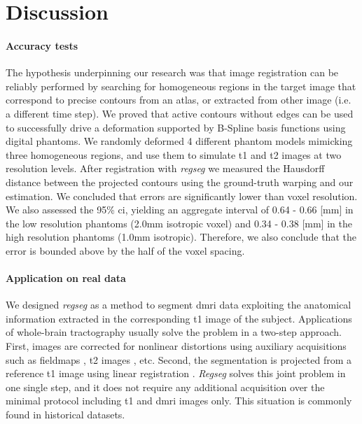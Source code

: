 \section{Discussion}
\label{sec:discussion}

\paragraph*{Accuracy tests}
The hypothesis underpinning our research was that image registration can be reliably performed
  by searching for homogeneous regions in the target image that correspond to precise contours
  from an atlas, or extracted from other image (i.e. a different time step).
We proved that active contours without edges can be used to successfully drive a
  deformation supported by B-Spline basis functions using digital phantoms.
We randomly deformed 4 different phantom models mimicking three homogeneous regions,
  and use them to simulate \gls*{t1} and \gls*{t2} images at two resolution levels.
After registration with \emph{regseg} we measured the Hausdorff distance between the
  projected contours using the ground-truth warping and our estimation.
We concluded that errors are significantly lower than voxel resolution.
We also assessed the 95\% \gls*{ci}, yielding an aggregate interval of
  0.64 - 0.66 [mm] in the low resolution phantoms (2.0mm isotropic voxel) and
  0.34 - 0.38 [mm] in the high resolution phantoms (1.0mm isotropic).
Therefore, we also conclude that the error is bounded above by the half of the
  voxel spacing.

\paragraph*{Application on real data}
We designed \emph{regseg} as a method to segment \gls*{dmri} data exploiting the
  anatomical information extracted in the corresponding \gls*{t1} image of the subject.
Applications of whole-brain tractography \citep{smith_tractbased_2006,craddock_imaging_2013}
  usually solve the problem in a two-step approach.
First, images are corrected for nonlinear distortions using auxiliary acquisitions
  such as fieldmaps \citep{jezzard_correction_1995}, \gls*{t2} images \citep{kybic_unwarping_2000},
  etc.
Second, the segmentation is projected from a reference \gls*{t1} image using linear
  registration \citep{greve_accurate_2009}.
\emph{Regseg} solves this joint problem in one single step, and it does not require any additional
  acquisition over the minimal protocol including \gls*{t1} and \gls*{dmri} images only.
This situation is commonly found in historical datasets.

